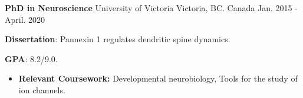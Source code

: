 

\begin{cventries}

\cventry
    {\textbf{PhD in Neuroscience}} %
    {University of Victoria} %
    {Victoria, BC. Canada} %
    {Jan. 2015 - April. 2020} %
    {
      \begin{cvitems} %
        \item \textbf{Dissertation}: Pannexin 1 regulates dendritic spine dynamics.
        \item \textbf{GPA}: 8.2/9.0.
          \begin{itemize}
          \item \textbf{Relevant Coursework:} Developmental neurobiology, Tools for the study of ion channels.
          \end{itemize}   
      \end{cvitems}
    }
  

\end{cventries}

